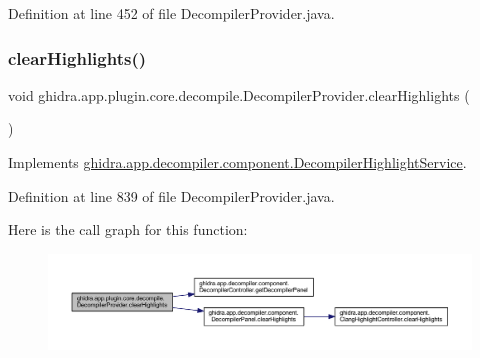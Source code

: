 Definition at line 452 of file Decompiler\+Provider.\+java.

\mbox{\label{classghidra_1_1app_1_1plugin_1_1core_1_1decompile_1_1_decompiler_provider_aca72811905babb72039a3a1ad1e81ad8}} 
\subsubsection{\texorpdfstring{clearHighlights()}{clearHighlights()}}
{\footnotesize\ttfamily void ghidra.\+app.\+plugin.\+core.\+decompile.\+Decompiler\+Provider.\+clear\+Highlights (\begin{DoxyParamCaption}{ }\end{DoxyParamCaption})\hspace{0.3cm}{\ttfamily [inline]}}



Implements \mbox{\hyperlink{interfaceghidra_1_1app_1_1decompiler_1_1component_1_1_decompiler_highlight_service_af99e44c458009975b48cd1974fd6e727}{ghidra.\+app.\+decompiler.\+component.\+Decompiler\+Highlight\+Service}}.



Definition at line 839 of file Decompiler\+Provider.\+java.

Here is the call graph for this function\+:
\nopagebreak
\begin{figure}[H]
\begin{center}
\leavevmode
\includegraphics[width=350pt]{classghidra_1_1app_1_1plugin_1_1core_1_1decompile_1_1_decompiler_provider_aca72811905babb72039a3a1ad1e81ad8_cgraph}
\end{center}
\end{figure}
\mbox{\label{classghidra_1_1app_1_1plugin_1_1core_1_1decompile_1_1_decompiler_provider_abee9f64402916ef4a8d48c8e699173d9}} 
